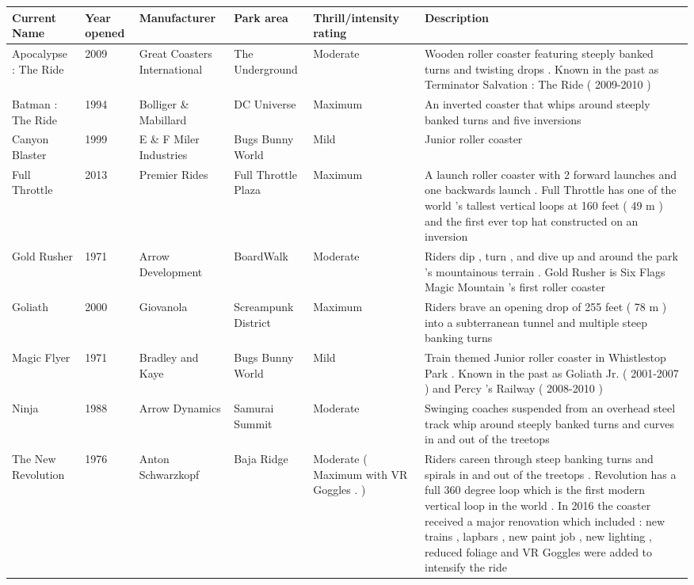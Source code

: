 \documentclass{article}
\begin{document}
\begin{tabular}{llllll}
\toprule
Current Name & Year opened & Manufacturer & Park area & Thrill/intensity rating & Description \\
\midrule
Apocalypse : The Ride & 2009 & Great Coasters International & The Underground & Moderate & Wooden roller coaster featuring steeply banked turns and twisting drops . Known in the past as Terminator Salvation : The Ride ( 2009-2010 ) \\
Batman : The Ride & 1994 & Bolliger \& Mabillard & DC Universe & Maximum & An inverted coaster that whips around steeply banked turns and five inversions \\
Canyon Blaster & 1999 & E \& F Miler Industries & Bugs Bunny World & Mild & Junior roller coaster \\
Full Throttle & 2013 & Premier Rides & Full Throttle Plaza & Maximum & A launch roller coaster with 2 forward launches and one backwards launch . Full Throttle has one of the world 's tallest vertical loops at 160 feet ( 49 m ) and the first ever top hat constructed on an inversion \\
Gold Rusher & 1971 & Arrow Development & BoardWalk & Moderate & Riders dip , turn , and dive up and around the park 's mountainous terrain . Gold Rusher is Six Flags Magic Mountain 's first roller coaster \\
Goliath & 2000 & Giovanola & Screampunk District & Maximum & Riders brave an opening drop of 255 feet ( 78 m ) into a subterranean tunnel and multiple steep banking turns \\
Magic Flyer & 1971 & Bradley and Kaye & Bugs Bunny World & Mild & Train themed Junior roller coaster in Whistlestop Park . Known in the past as Goliath Jr. ( 2001-2007 ) and Percy 's Railway ( 2008-2010 ) \\
Ninja & 1988 & Arrow Dynamics & Samurai Summit & Moderate & Swinging coaches suspended from an overhead steel track whip around steeply banked turns and curves in and out of the treetops \\
The New Revolution & 1976 & Anton Schwarzkopf & Baja Ridge & Moderate ( Maximum with VR Goggles . ) & Riders careen through steep banking turns and spirals in and out of the treetops . Revolution has a full 360 degree loop which is the first modern vertical loop in the world . In 2016 the coaster received a major renovation which included : new trains , lapbars , new paint job , new lighting , reduced foliage and VR Goggles were added to intensify the ride \\

\end{tabular}
\end{document}
